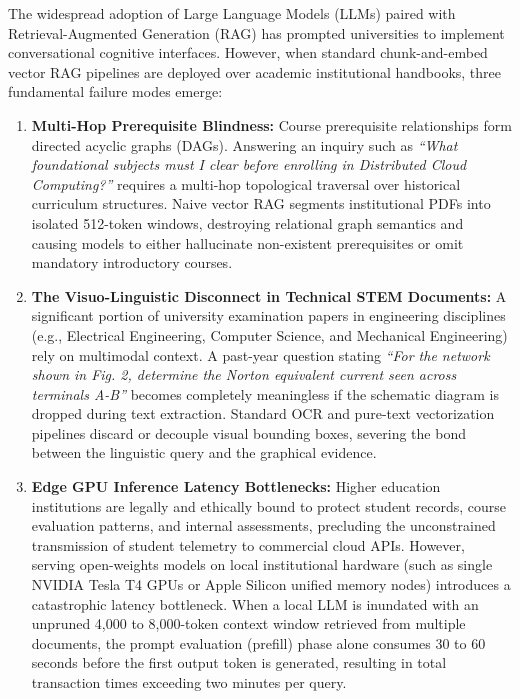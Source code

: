 \documentclass[conference]{IEEEtran}
\begin{document}
The widespread adoption of Large Language Models (LLMs) paired with Retrieval-Augmented Generation (RAG) \cite{lewis2020rag} has prompted universities to implement conversational cognitive interfaces. However, when standard chunk-and-embed vector RAG pipelines are deployed over academic institutional handbooks, three fundamental failure modes emerge:
\begin{enumerate}
    \item \textbf{Multi-Hop Prerequisite Blindness:} Course prerequisite relationships form directed acyclic graphs (DAGs). Answering an inquiry such as \textit{``What foundational subjects must I clear before enrolling in Distributed Cloud Computing?''} requires a multi-hop topological traversal over historical curriculum structures. Naive vector RAG segments institutional PDFs into isolated 512-token windows, destroying relational graph semantics and causing models to either hallucinate non-existent prerequisites or omit mandatory introductory courses.
    \item \textbf{The Visuo-Linguistic Disconnect in Technical STEM Documents:} A significant portion of university examination papers in engineering disciplines (e.g., Electrical Engineering, Computer Science, and Mechanical Engineering) rely on multimodal context. A past-year question stating \textit{``For the network shown in Fig. 2, determine the Norton equivalent current seen across terminals A-B''} becomes completely meaningless if the schematic diagram is dropped during text extraction. Standard OCR and pure-text vectorization pipelines discard or decouple visual bounding boxes, severing the bond between the linguistic query and the graphical evidence.
    \item \textbf{Edge GPU Inference Latency Bottlenecks:} Higher education institutions are legally and ethically bound to protect student records, course evaluation patterns, and internal assessments, precluding the unconstrained transmission of student telemetry to commercial cloud APIs. However, serving open-weights models on local institutional hardware (such as single NVIDIA Tesla T4 GPUs or Apple Silicon unified memory nodes) introduces a catastrophic latency bottleneck. When a local LLM is inundated with an unpruned 4,000 to 8,000-token context window retrieved from multiple documents, the prompt evaluation (prefill) phase alone consumes 30 to 60 seconds before the first output token is generated, resulting in total transaction times exceeding two minutes per query.
\end{enumerate}
\end{document}
